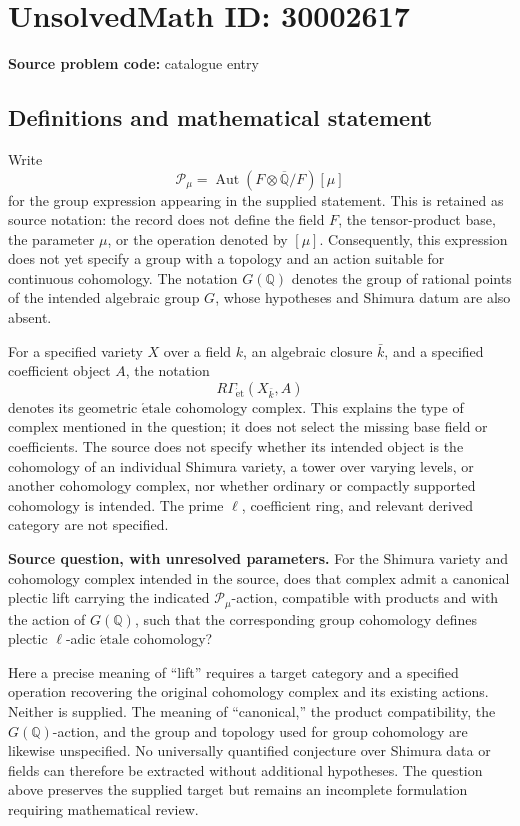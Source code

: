 \documentclass[11pt]{article}
\newcommand{\Q}{\mathbb{Q}}
\begin{document}
\section*{UnsolvedMath ID: 30002617}
\textbf{Source problem code:} catalogue entry
\subsection{Definitions and mathematical statement}
Write
\[
\mathcal P_{\mu}=\operatorname{Aut}(F\otimes\overline{\Q}/F)[\mu]
\]
for the group expression appearing in the supplied statement. This is retained as source notation: the record does not define the field \(F\), the tensor-product base, the parameter \(\mu\), or the operation denoted by \([\mu]\). Consequently, this expression does not yet specify a group with a topology and an action suitable for continuous cohomology. The notation \(G(\Q)\) denotes the group of rational points of the intended algebraic group \(G\), whose hypotheses and Shimura datum are also absent.

For a specified variety \(X\) over a field \(k\), an algebraic closure \(\bar k\), and a specified coefficient object \(A\), the notation
\[
R\Gamma_{\mathrm{\acute et}}(X_{\bar k},A)
\]
denotes its geometric \(\mathrm{\acute etale}\) cohomology complex. This explains the type of complex mentioned in the question; it does not select the missing base field or coefficients. The source does not specify whether its intended object is the cohomology of an individual Shimura variety, a tower over varying levels, or another cohomology complex, nor whether ordinary or compactly supported cohomology is intended. The prime \(\ell\), coefficient ring, and relevant derived category are not specified.

\textbf{Source question, with unresolved parameters.} For the Shimura variety and cohomology complex intended in the source, does that complex admit a canonical plectic lift carrying the indicated \(\mathcal P_{\mu}\)-action, compatible with products and with the action of \(G(\Q)\), such that the corresponding group cohomology defines plectic \(\ell\)-adic \(\mathrm{\acute etale}\) cohomology?

Here a precise meaning of ``lift'' requires a target category and a specified operation recovering the original cohomology complex and its existing actions. Neither is supplied. The meaning of ``canonical,'' the product compatibility, the \(G(\Q)\)-action, and the group and topology used for group cohomology are likewise unspecified. No universally quantified conjecture over Shimura data or fields can therefore be extracted without additional hypotheses. The question above preserves the supplied target but remains an incomplete formulation requiring mathematical review.
\end{document}
